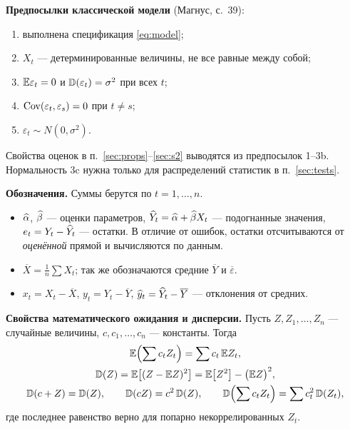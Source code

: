 \textbf{Предпосылки классической модели} (Магнус, с.~39):
\begin{enumerate}[label=\arabic*), leftmargin=2.2em, itemsep=2pt]
  \item выполнена спецификация \eqref{eq:model};
  \item $X_t$ — детерминированные величины, не все равные между собой;
  \item[3a)] $\mathbb{E}\varepsilon_t = 0$ и $\mathbb{D}(\varepsilon_t) = \sigma^2$ при всех $t$;
  \item[3b)] $\mathrm{Cov}(\varepsilon_t, \varepsilon_s) = 0$ при $t \neq s$;
  \item[3c)] $\varepsilon_t \sim N(0, \sigma^2)$.
\end{enumerate}
Свойства оценок в п.~\ref{sec:props}--\ref{sec:s2} выводятся из предпосылок
1--3b. Нормальность 3c нужна только для распределений статистик в
п.~\ref{sec:tests}.

\textbf{Обозначения.} Суммы берутся по $t = 1,\dots,n$.
\begin{itemize}[leftmargin=2.2em, itemsep=2pt]
  \item $\widehat{\alpha}$, $\widehat{\beta}$ — оценки параметров, $\widehat{Y}_t = \widehat{\alpha} + \widehat{\beta} X_t$ — подогнанные
        значения, $e_t = Y_t - \widehat{Y}_t$ — остатки. В отличие от ошибок, остатки
        отсчитываются от \emph{оценённой} прямой и вычисляются по данным.
  \item $\overline{X} = \tfrac{1}{n}\sum X_t$; так же обозначаются средние
        $\overline{Y}$ и $\overline{\varepsilon}$.
  \item $x_t = X_t - \overline{X}$, $y_t = Y_t - \overline{Y}$,
        $\widehat{y}_t = \widehat{Y}_t - \overline{Y}$ — отклонения от средних.
\end{itemize}

\textbf{Свойства математического ожидания и дисперсии.} Пусть
$Z, Z_1, \dots, Z_n$ — случайные величины, $c, c_1, \dots, c_n$ — константы.
Тогда
\begin{gather}
  \mathbb{E}\Bigl(\sum c_tZ_t\Bigr) = \sum c_t\,\mathbb{E} Z_t,
  \label{eq:E-lin} \\
  \mathbb{D}(Z) = \mathbb{E}\bigl[(Z - \mathbb{E} Z)^2\bigr] = \mathbb{E}\bigl[Z^2\bigr] - \bigl(\mathbb{E} Z\bigr)^2,
  \label{eq:D-def} \\
  \mathbb{D}(c + Z) = \mathbb{D}(Z),
  \qquad
  \mathbb{D}(cZ) = c^2\,\mathbb{D}(Z),
  \qquad
  \mathbb{D}\Bigl(\sum c_tZ_t\Bigr) = \sum c_t^2\,\mathbb{D}(Z_t),
  \label{eq:D-props}
\end{gather}
где последнее равенство верно для попарно некоррелированных $Z_t$.

